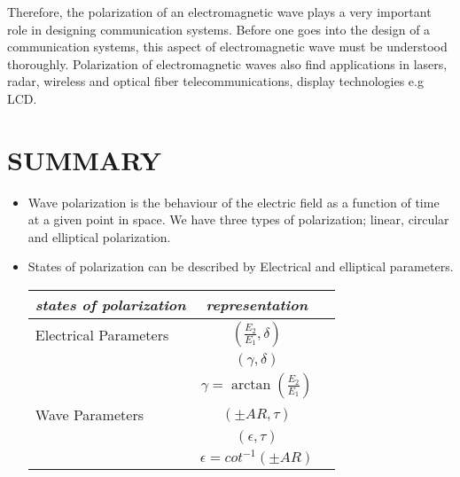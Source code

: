 	Therefore, the polarization of an electromagnetic wave plays a very important role in designing communication systems. Before one goes into the design of a communication systems, this aspect of electromagnetic wave must be understood thoroughly. Polarization of electromagnetic waves also find applications in lasers, radar, wireless and optical fiber telecommunications, display technologies e.g LCD.
	
	\section{SUMMARY}
	\begin{itemize}
		\item Wave polarization is the behaviour of the electric field as a function of time at a given point in space. We have three types of polarization; linear, circular and elliptical polarization.\\
		\item States of polarization can be described by Electrical and elliptical parameters.
		
		\begin{tabular}{lccl} 
			\multicolumn{2}{c}{\textit{states of polarization}} &\textit{representation} \\ \hline %
			Electrical Parameters &          &$ (\frac{E_{2}}{E_{1}}, \delta) $\-          \\        %
			&  & $ (\gamma, \delta) $\\   %
			&          &$ \gamma = \arctan(\frac{E_{2}}{E_{1}}) $\\  %
			Wave Parameters &          &$ (\pm AR, \tau) $\\ %
			&          &$ (\epsilon, \tau) $\\  %
			&          &$ \epsilon = cot^{-1}(\pm AR) $
			

\end{tabular}
\end{itemize}
